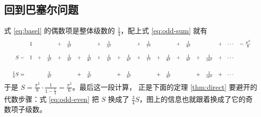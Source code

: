 \subsection{回到巴塞尔问题}

式 \eqref{eq:basel} 的偶数项是整体级数的 $\frac14$，配上式 \eqref{eq:odd-sum} 就有
\begin{equation}
  \resizebox{\textwidth}{!}{$
  \begin{array}{r*{21}{c}r}
    &1&&&+&\frac{1}{3^{2}}&&&+&\frac{1}{5^{2}}&&&+&\frac{1}{7^{2}}&&&+&\frac{1}{9^{2}}
    &&&+&\cdots&=\frac{\pi^{2}}{8}\\[14pt]
    S=&1&+&\frac{1}{2^{2}}&+&\frac{1}{3^{2}}&+&\frac{1}{4^{2}}&+&\frac{1}{5^{2}}
    &+&\frac{1}{6^{2}}&+&\frac{1}{7^{2}}&+&\frac{1}{8^{2}}&+&\frac{1}{9^{2}}
    &+&\frac{1}{10^{2}}&+&\cdots&\\[20pt]
    \frac{1}{4}S=&&&\frac{1}{2^{2}}&&&+&\frac{1}{4^{2}}&&&+&\frac{1}{6^{2}}
    &&&+&\frac{1}{8^{2}}&&&+&\frac{1}{10^{2}}&+&\cdots&
  \end{array}$}
  \label{eq:odd-even}
\end{equation}
于是 $S=\frac{\pi^{2}}{8}\cdot\frac{1}{1-\frac14}=\frac{\pi^{2}}{6}$。最后这一段计算，
正是下面的定理 \ref{thm:direct} 要避开的代数步骤：式 \eqref{eq:odd-even} 把 $S$ 换成了
$\frac34 S$，图上的信息也就跟着换成了它的奇数项子级数。
